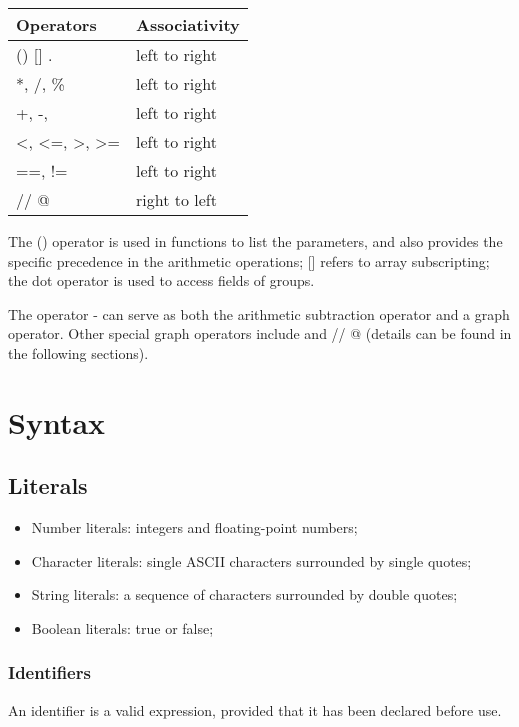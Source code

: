 \documentclass[11pt,letterpaper]{article}
\begin{document}
\begin{center}
    \begin{tabular}{| p{4cm} | p{4cm} |}		\hline
    Operators 		& Associativity \\ 		\hline \hline
    () [] . 			& left to right \\ 		\hline
    *, /, \% 		& left to right \\ 		\hline
    +, -, \textbar	& left to right \\ 		\hline
    \textless,  \textless=,  \textgreater,  \textgreater=	& left to right \\ 		\hline
    ==,  !=			& left to right \\ 		\hline
    // @				& right to left\\ 		\hline
    
    \end{tabular}
\end{center}

The () operator is used in functions to list the parameters, and also provides the specific precedence in the arithmetic operations; [] refers to array subscripting; the dot operator is used to access fields of groups. 

The operator - can serve as both the arithmetic subtraction operator and a graph operator.  Other special graph operators include \textbar and // @ (details can be found in the following sections).

\section {Syntax}
\subsection {Literals}
\begin{itemize}
\item Number literals: integers and floating-point numbers;
\item Character literals: single ASCII characters surrounded by single quotes;
\item String literals: a sequence of characters surrounded by double quotes;
\item Boolean literals: true or false;
\end{itemize}
\subsubsection {Identifiers}
An identifier is a valid expression, provided that it has been declared before use.
\end{document}
